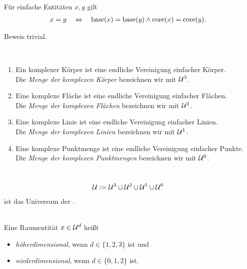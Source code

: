 \begin{satz}\label{satz:base-intv-ident}
    Für einfache Entitäten $x,y$ gilt
    \begin{align*}
        x = y \quad \Leftrightarrow \quad \text{base}(x) = \text{base}(y) \land \text{core}(x) = \text{core}(y).
    \end{align*}
\end{satz}
Beweis trivial.


\begin{dfn}\
    \begin{enumerate}
        \item Ein komplexer Körper ist eine endliche Vereinigung einfacher Körper.\\
            Die \emph{Menge der komplexen Körper} bezeichnen wir mit $\mathcal{U}^3$.
        \item Eine komplexe Fläche ist eine endliche Vereinigung einfacher Flächen.\\
            Die \emph{Menge der komplexen Flächen} bezeichnen wir mit $\mathcal{U}^2$.
        \item Eine komplexe Linie ist eine endliche Vereinigung einfacher Linien.\\
            Die \emph{Menge der komplexen Linien} bezeichnen wir mit $\mathcal{U}^1$.
        \item Eine komplexe Punktmenge ist eine endliche Vereinigung einfacher Punkte.\\
            Die \emph{Menge der komplexen Punktmengen} bezeichnen wir mit $\mathcal{U}^0$.
    \end{enumerate}
\end{dfn}


\begin{dfn}[Universum]\ 
    \begin{align*}
        \mathcal{U} := \mathcal{U}^3 \cup \mathcal{U}^2 \cup \mathcal{U}^1 \cup \mathcal{U}^0
    \end{align*}
    ist das Universum der \strukt.
\end{dfn}

\begin{dfn}\ \\
    Eine Raumentität $x \in \mathcal{U}^d$ heißt
    \begin{itemize}
        \item \emph{höherdimensional}, wenn $d \in \{1,2,3\}$ ist und
        \item \emph{niederdimensional}, wenn $d \in \{0,1,2\}$ ist.
    \end{itemize}
\end{dfn}



